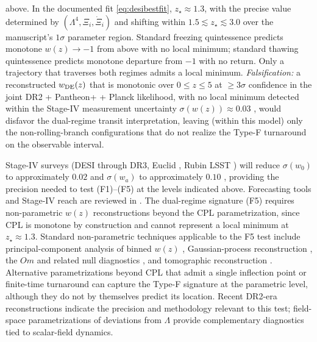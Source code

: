 \documentclass[11pt,reqno]{amsart}
\theoremstyle{plain}
\theoremstyle{definition}
\theoremstyle{remark}
\begin{document}
\begin{enumerate}
        above. In the documented fit \eqref{eq:desibestfit},
        $z_\star \approx 1.3$, with the precise value determined by
        $(\Lambda^{4}, \Xi_i, \dot\Xi_i)$ and shifting within
        $1.5 \lesssim z_\star \lesssim 3.0$ over the manuscript's
        $1\sigma$ parameter region. Standard freezing quintessence
        \cite{CaldwellLinder2005} predicts monotone $w(z) \to -1$ from
        above with no local minimum; standard thawing quintessence
        predicts monotone departure from $-1$ with no return. Only a
        trajectory that traverses both regimes admits a local minimum.
        \emph{Falsification:} a reconstructed $w_{\rm DE}(z)$ that is
        monotonic over $0 \leq z \leq 5$ at $\geq 3\sigma$ confidence
        in the joint DR2 + Pantheon+ + Planck likelihood, with no
        local minimum detected within the Stage-IV measurement
        uncertainty $\sigma(w(z)) \approx 0.03$
        \cite{ShajibFrieman2025}, would disfavor the dual-regime
        transit interpretation, leaving (within this model) only the
        non-rolling-branch configurations that do not realize the
        Type-F turnaround on the observable interval.
\end{enumerate}
Stage-IV surveys (DESI through DR3, Euclid \cite{EuclidLaureijs2011},
Rubin LSST \cite{LSSTIvezic2019}) will reduce
$\sigma(w_0)$ to approximately $0.02$ and $\sigma(w_a)$ to approximately
$0.10$ \cite{ShajibFrieman2025,Turyshev2026Review}, providing the
precision needed to test (F1)--(F5) at the levels indicated above.
Forecasting tools and Stage-IV reach are reviewed in
\cite{Albrecht2006DETF,Aubourg2015}.
The dual-regime signature (F5) requires non-parametric $w(z)$
reconstructions beyond the CPL parametrization, since CPL is monotone
by construction and cannot represent a local minimum at
$z_\star \approx 1.3$. Standard non-parametric techniques applicable
to the F5 test include principal-component analysis of binned $w(z)$
\cite{CrittendenPogosianZhao2009}, Gaussian-process reconstruction
\cite{Holsclaw2010GP}, the $Om$ and related null diagnostics
\cite{SahniShafielooStarobinsky2008}, and tomographic reconstruction
\cite{PogosianShafieloo2009}. Alternative parametrizations beyond CPL
that admit a single inflection point or finite-time turnaround
\cite{JassalBaglaPadmanabhan2005,BarbozaAlcaniz2008} can capture the
Type-F signature at the parametric level, although they do not by
themselves predict its location. Recent DR2-era reconstructions
\cite{Wang2026QReconstruction,Adil2026Analytic} indicate the
precision and methodology relevant to this test; field-space
parametrizations of deviations from $\Lambda$
\cite{CrittendenMajerottoPiazza2007,Linder2006Paths} provide
complementary diagnostics tied to scalar-field dynamics.
\end{document}
